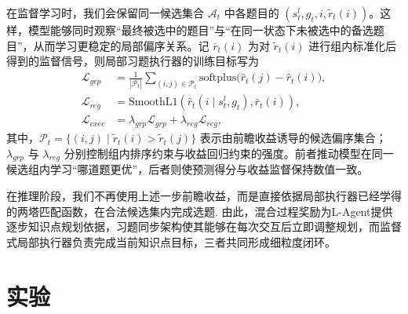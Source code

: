 \documentclass[UTF8,a4paper,zihao=5,twocolumn]{ctexart}
\begin{document}
在监督学习时，我们会保留同一候选集合 $\mathcal{A}_t$ 中各题目的 $(s_t^l,g_t,i,\tilde{r}_t(i))$。这样，模型能够同时观察“最终被选中的题目”与“在同一状态下未被选中的备选题目”，从而学习更稳定的局部偏序关系。记 $\bar{r}_t(i)$ 为对 $\tilde{r}_t(i)$ 进行组内标准化后得到的监督信号，则局部习题执行器的训练目标写为
\begin{equation}
\begin{aligned}
\mathcal{L}_{grp}
&=
\frac{1}{|\mathcal{P}_t|}
\sum_{(i,j)\in\mathcal{P}_t}
\mathrm{softplus}\!\big(
\hat{r}_{t}(j)-\hat{r}_{t}(i)
\big),\\
\mathcal{L}_{reg}
&=
\mathrm{SmoothL1}\!\left(
\hat{r}_{t}(i\mid s_t^l,g_t),\bar{r}_t(i)
\right),\\
\mathcal{L}_{exec}
&=
\lambda_{grp} \mathcal{L}_{grp}
+
\lambda_{reg} \mathcal{L}_{reg},
\end{aligned}
\end{equation}
其中，$\mathcal{P}_t=\{(i,j)\mid \tilde{r}_t(i)>\tilde{r}_t(j)\}$ 表示由前瞻收益诱导的候选偏序集合；$\lambda_{grp}$ 与 $\lambda_{reg}$ 分别控制组内排序约束与收益回归约束的强度。前者推动模型在同一候选组内学习“哪道题更优”，后者则使预测得分与收益监督保持数值一致。

在推理阶段，我们不再使用上述一步前瞻收益，而是直接依据局部执行器已经学得的两塔匹配函数，在合法候选集内完成选题.
由此，混合过程奖励为L-Agent提供逐步知识点规划依据，习题同步架构使其能够在每次交互后立即调整规划，而监督式局部执行器负责完成当前知识点目标，三者共同形成细粒度闭环。

\section{实验}
\end{document}
